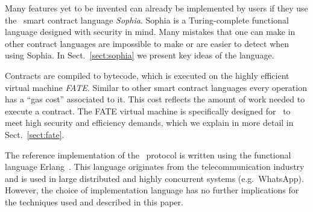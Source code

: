 Many features yet to be invented can already be implemented
by users if they use the \aet\ smart contract language
\textit{Sophia}. Sophia is a Turing-complete functional language
designed with security in mind. Many mistakes that one can make in
other contract languages are impossible to make or are easier to detect
when using Sophia. In Sect.\ \ref{sect:sophia} we present key
ideas of the language.

Contracts are compiled to bytecode, which is executed on the highly
efficient virtual machine \textit{FATE}. Similar to other smart contract
languages every operation has a \enquote{gas cost} associated to it. This cost
reflects
the amount of work needed to execute a contract. The FATE virtual machine is
specifically designed for
\aet\ to meet high security and efficiency demands, which we
explain in more detail in Sect.~\ref{sect:fate}.

The reference implementation of the \aet\ protocol is written using the
functional language Erlang~\cite{Armstrong:2010:ERL:1810891.1810910}. This
language originates from the telecommunication industry and is used in large
distributed and highly concurrent systems (e.g.\ WhatsApp). However, the choice
of implementation language has no further implications for the techniques used
and described in this paper.
